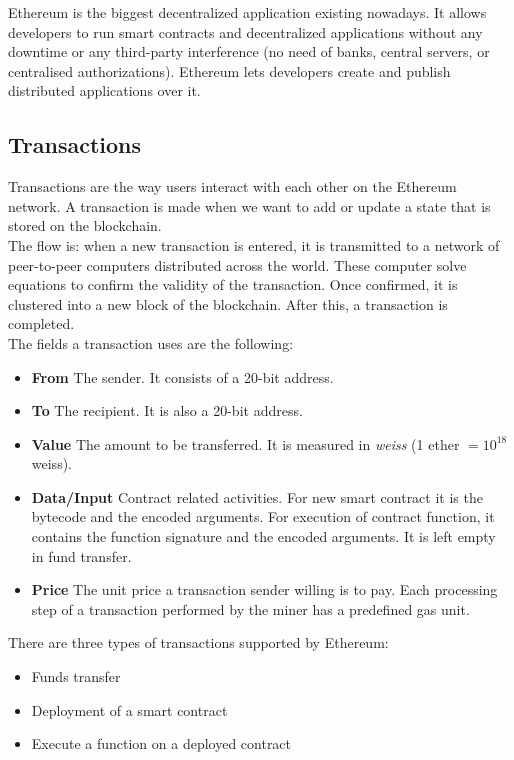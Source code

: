 \documentclass[10pt]{article}
\begin{document}
\begin{multicols}{2}
Ethereum is the biggest decentralized application existing nowadays. It allows developers to run smart contracts and decentralized applications without any downtime or any third-party interference (no need of banks, central servers, or centralised authorizations). Ethereum lets developers create and publish distributed applications over it.

\subsection{Transactions}

Transactions are the way users interact with each other on the Ethereum network. A transaction is made when we want to add or update a state that is stored on the blockchain.\\

The flow is: when a new transaction is entered, it is transmitted to a network of peer-to-peer computers distributed across the world. These computer solve equations to confirm the validity of the transaction. Once confirmed, it is clustered into a new block of the blockchain. After this, a transaction is completed.\\

The fields a transaction uses are the following:

\begin{itemize}
	\item \textbf{From} The sender. It consists of a 20-bit address. 
	\item \textbf{To} The recipient. It is also a 20-bit address. 
	\item \textbf{Value} The amount to be transferred. It is measured in \textit{weiss} (1 ether \(=10^{18}\) weiss). 
	\item \textbf{Data/Input} Contract related activities. For new smart contract it is the bytecode and the encoded arguments. For execution of contract function, it contains the function signature and the encoded arguments. It is left empty in fund transfer. 
	\item \textbf{Price} The unit price a transaction sender willing is to pay. Each processing step of a transaction performed by the miner has a predefined gas unit. 
\end{itemize}

There are three types of transactions supported by Ethereum:

\begin{itemize}
	\item Funds transfer
	\item Deployment of a smart contract
	\item Execute a function on a deployed contract
\end{itemize}


\end{multicols}
\end{document}
